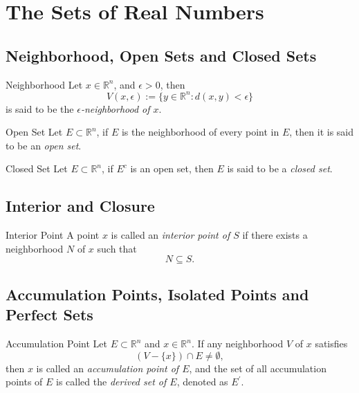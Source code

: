 \section{The Sets of Real Numbers}

\subsection{Neighborhood, Open Sets and Closed Sets}

\begin{definition}{Neighborhood}{}
  Let $x \in \mathbb{R}^n$, and $\epsilon > 0$, then 
  \begin{equation}
    V(x, \epsilon) := \{y \in \mathbb{R}^n: d(x,y) < \epsilon\}
  \end{equation}
  is said to be the \emph{$\epsilon$-neighborhood of $x$}.
\end{definition}

\begin{definition}{Open Set}{}
  Let $E \subset \mathbb{R}^n$, if $E$ is the neighborhood of every point in
  $E$,
  then it is said to be an \emph{open set}.
\end{definition}

\begin{definition}{Closed Set}{}
  Let $E \subset \mathbb{R}^n$, if $E^c$ is an open set,
  then $E$ is said to be a \emph{closed set}.
\end{definition}

\subsection{Interior and Closure}

\begin{definition}{Interior Point}{}
  A point $x$ is called an \emph{interior point of $S$} if there exists a
  neighborhood $N$ of $x$ such that
  \begin{equation}
    N \subseteq S.
  \end{equation}
\end{definition}




\subsection{Accumulation Points, Isolated Points and Perfect Sets}

\begin{definition}{Accumulation Point}{}
  Let $E \subset \mathbb{R}^n$ and $x \in \mathbb{R}^n$.
  If any neighborhood $V$ of $x$ satisfies
  \begin{equation}
    (V - \{x\}) \cap E \neq \emptyset,
  \end{equation}
  then $x$ is called an \emph{accumulation point of $E$},
  and the set of all accumulation points of $E$ is called the \emph{derived set
    of $E$}, denoted as $E^{\prime}$.
\end{definition}

